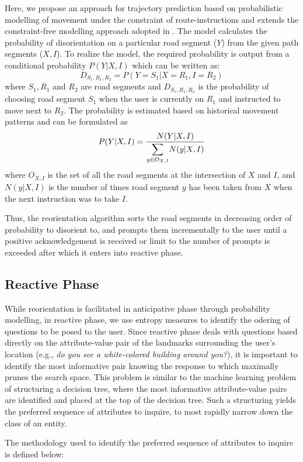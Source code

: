 \documentclass{iitkthesis}
\begin{document}
Here, we propose an approach for trajectory prediction based on probabilistic 
modelling of movement under the constraint of route-instructions and 
extends the constraint-free modelling approach adopted in \cite{liu}. The 
model calculates the probability of disorientation on a particular road segment 
($Y$) from the given path segments ($X,I$). To realize the model, the 
required probability is output from a conditional probability $P(Y|X,I)$ 
which can be written as:
%
$$D_{S_1,R_1,R_2} = P(Y=S_1|X=R_1,I=R_2)$$
%
where $S_1,R_1$ and $R_2$ are road segments and $D_{S_1,R_1,R_2}$ is the 
probability of choosing road segment $S_1$ when the user is currently 
on $R_1$ and instructed to move next to $R_2$. The probability is 
estimated based on historical movement patterns and can be formulated as
%
\[ \displaystyle P(Y|X,I) = \frac{N(Y|X,I)}{ \mathlarger{\sum}\limits_{y \in O_{X,I}} N(y|X,I)} \] 
%
where $O_{X,I}$ is the set of all the road segments at the intersection 
of $X$ and $I$, and $N(y|X,I)$ is the number of times road segment $y$ 
has been taken from $X$ when the next instruction was to take $I$. 

Thus, the reorientation algorithm sorts the road segments in decreasing order 
of probability to disorient to, and prompts them incrementally to the 
user until a positive acknowledgement is received or limit to the number 
of prompts is exceeded after which it enters into reactive phase.

\subsection{Reactive Phase}
While reorientation is facilitated in anticipative phase through probability modelling, in reactive phase, we use entropy measures to identify the odering of questions to be posed to the user. Since reactive phase deals with questions based directly on the attribute-value pair of the landmarks surrounding the user's location (e.g., \textit{do you see a white-colored building around you?}), it is important to identify the most informative pair knowing the response to which maximally prunes the search space. This problem is similar to the machine learning problem of structuring a decision tree, where the most informative attribute-value pairs are identified and placed at the top of the decision tree. Such a structuring yields the preferred sequence of attributes to inquire, to most rapidly narrow down the class of an entity. 

The methodology used to identify the preferred sequence of attributes to inquire is defined below:
\end{document}
